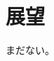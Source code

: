 \chapter{展望}
\label{chap:futurework}

まだない。

\begin{comment}

\section{まとめ}

\LaTeX の環境さえあればスタンダードな体裁の論文がたぶんだれでも作れる程度のテンプレートにはなっているはず。がんばって卒業しよう。


\section{大事なこと}

箇条書きで列挙する。

\begin{itemize}
 \item ぐぐる。これは単なる\LaTeX だし、\LaTeX はもう枯れた技術だから、調べれば文献はいくらでもある。
 \item 先生を頼る。
 \item 単位をきちんとる。
 \item 卒業する。
\end{itemize}


\end{comment}